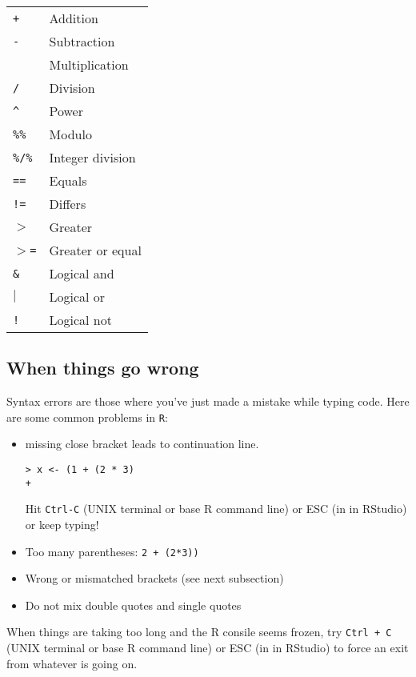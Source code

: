 \begin{tabular}{p{2cm} p{11cm}} 
 {\tt +} & Addition \\
 {\tt -} & Subtraction\\
 {\tt *} & Multiplication\\
 {\tt /} & Division\\
 {\tt \textasciicircum} & Power\\
 {\tt \%\%} & Modulo\\
 {\tt \%/\%} & Integer division\\
 {\tt ==} & Equals\\
 {\tt !=} & Differs\\
 {\tt $>$} & Greater\\
 {\tt $>$=} & Greater or equal\\
 {\tt \&} & Logical and\\
 {\tt $\vert$} & Logical or\\
 {\tt !} & Logical not\\
\end{tabular}

\subsection{When things go wrong}

Syntax errors are those where you've just made a mistake while typing 
code. Here are some common problems in {\tt R}: 

\begin{itemize}
\item missing close bracket leads to  continuation line.
\begin{lstlisting}
> x <- (1 + (2 * 3)
+ 
\end{lstlisting}
Hit {\tt Ctrl-C} (UNIX terminal or base R command line) or ESC (in in RStudio) or keep typing!

\item Too many parentheses: {\tt 2 + (2*3))}

\item Wrong or mismatched brackets (see next subsection)

\item Do not mix double quotes and single quotes

\end{itemize}

\begin{tipbox}
	When things are taking too long and the R consile seems frozen, try 
	{\tt Ctrl + C} (UNIX terminal or base R command line) or ESC (in in RStudio) to force an exit from whatever is going on.
\end{tipbox}

